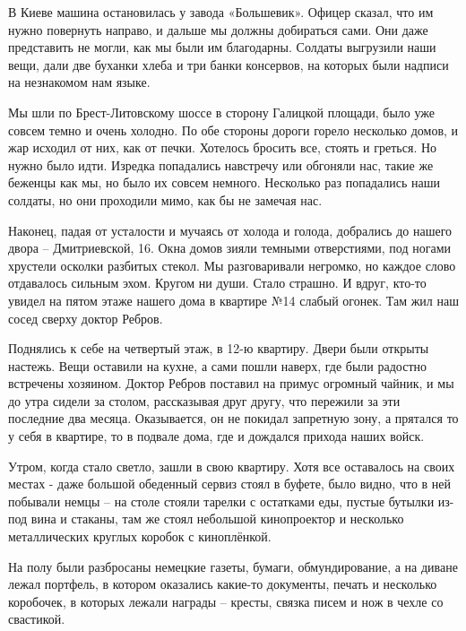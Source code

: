 В Киеве машина остановилась у завода «Большевик». Офицер сказал, что им нужно
повернуть направо, и дальше мы должны добираться сами. Они даже представить не
могли, как мы были им благодарны. Солдаты выгрузили наши вещи, дали две буханки
хлеба и три банки консервов, на которых были надписи на незнакомом нам языке.


Мы шли по Брест-Литовскому шоссе в сторону Галицкой площади, было уже совсем
темно и очень холодно. По обе стороны дороги горело несколько домов, и жар
исходил от них, как от печки. Хотелось бросить все, стоять и греться. Но нужно
было идти. Изредка попадались навстречу или обгоняли нас, такие же беженцы как
мы, но было их совсем немного. Несколько раз попадались наши солдаты, но они
проходили мимо, как бы не замечая нас.

Наконец, падая от усталости и мучаясь от холода и голода, добрались до нашего
двора – Дмитриевской, 16. Окна домов зияли темными отверстиями, под ногами
хрустели осколки разбитых стекол. Мы разговаривали негромко, но каждое слово
отдавалось сильным эхом. Кругом ни души. Стало страшно. И вдруг, кто-то увидел
на пятом этаже нашего дома в квартире №14 слабый огонек. Там жил наш сосед
сверху доктор Ребров.

Поднялись к себе на четвертый этаж, в 12-ю квартиру. Двери были открыты
настежь. Вещи оставили на кухне, а сами пошли наверх, где были радостно
встречены хозяином. Доктор Ребров поставил на примус огромный чайник, и мы до
утра сидели за столом, рассказывая друг другу, что пережили за эти последние
два месяца. Оказывается, он не покидал запретную зону, а прятался то у себя в
квартире, то в подвале дома, где и дождался прихода наших войск.

Утром, когда стало светло, зашли в свою квартиру. Хотя все оставалось на своих
местах - даже большой обеденный сервиз стоял в буфете, было видно, что в ней
побывали немцы – на столе стояли тарелки с остатками еды, пустые бутылки из-под
вина и стаканы, там же стоял небольшой кинопроектор и несколько металлических
круглых коробок с киноплёнкой. 


На полу были разбросаны немецкие газеты, бумаги,
обмундирование, а на диване лежал портфель, в котором оказались какие-то
документы, печать и несколько коробочек, в которых лежали награды – кресты,
связка писем и нож в чехле со свастикой.

